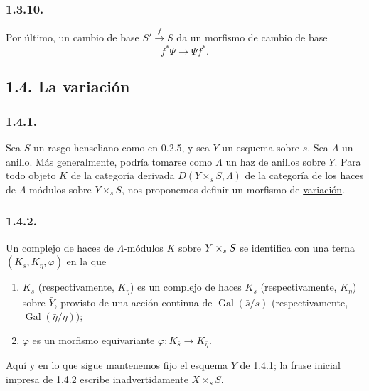 \pageoriginale

\subsubsection*{1.3.10.}
Por último, un cambio de base $S'\xrightarrow{f}S$ da un morfismo de cambio
de base
\begin{equation}\tag{1.3.10.1}
f^*\Psi\longrightarrow\Psi f^*.
\end{equation}
\subsection*{1.4. La variación}

\subsubsection*{1.4.1.}
Sea $S$ un rasgo henseliano como en 0.2.5, y sea $Y$ un esquema sobre $s$.
Sea $\Lambda$ un anillo. Más generalmente, podría tomarse como $\Lambda$ un
haz de anillos sobre $Y$. Para todo objeto $K$ de la categoría derivada
$D(Y\times_sS,\Lambda)$ de la categoría de los haces de $\Lambda$-módulos
sobre $Y\times_sS$, nos proponemos definir un morfismo de
\underline{variación}.

\subsubsection*{1.4.2.}
Un complejo de haces de $\Lambda$-módulos $K$ sobre
$\sisi{X}{Y}\times_sS$ se identifica con una terna
$(K_s,K_\eta,\varphi)$ en la que
\begin{enumerate}[label=\alph*)]
\item $K_s$ (respectivamente, $K_\eta$) es un complejo de haces
$K_{\bar s}$ (respectivamente, $K_{\bar\eta}$) sobre $\bar Y$, provisto de
una acción continua de $\operatorname{Gal}(\bar s/s)$ (respectivamente,
$\operatorname{Gal}(\bar\eta/\eta)$);

\item $\varphi$ es un morfismo equivariante
$\varphi:K_{\bar s}\longrightarrow K_{\bar\eta}$.
\end{enumerate}
Aquí y en lo que sigue mantenemos fijo el esquema $Y$ de 1.4.1; la frase
inicial impresa de 1.4.2 escribe inadvertidamente $X\times_sS$.

